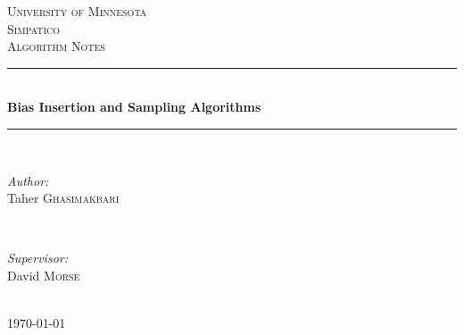 \documentclass[12pt]{article} %
\begin{document}

\begin{titlepage}

\newcommand{\HRule}{\rule{\linewidth}{0.5mm}} %

\center %

\textsc{\LARGE University of Minnesota}\\[1.5cm] %
\textsc{\Large Simpatico}\\[0.5cm] %
\textsc{\large Algorithm Notes}\\[0.5cm] %

\HRule \\[0.4cm]
{ \huge \bfseries Bias Insertion and Sampling Algorithms}\\[0.4cm] %
\HRule \\[1.5cm]

\begin{minipage}{0.4\textwidth}
\begin{flushleft} \large
\emph{Author:}\\
Taher \textsc{Ghasimakbari} %
\end{flushleft}
\end{minipage}
~
\begin{minipage}{0.4\textwidth}
\begin{flushright} \large
\emph{Supervisor:} \\
David \textsc{Morse} %
\end{flushright}
\end{minipage}\\[4cm]

{\large \today}\\[3cm] %


\vfill %

\end{titlepage}

\end{document}
